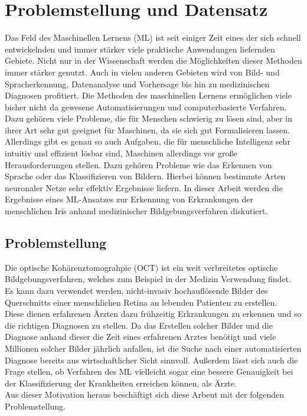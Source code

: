 \chapter{Problemstellung und Datensatz}

Das Feld des Maschinellen Lernens (ML) ist seit einiger Zeit eines der sich
schnell entwickelnden und immer stärker viele praktische Anwendungen liefernden
Gebiete. Nicht nur in der Wissenschaft werden die Möglichkeiten dieser Methoden
immer stärker genutzt. Auch in vielen anderen Gebieten wird von Bild- und
Spracherkennung, Datenanalyse und Vorhersage bis hin zu medizinischen Diagnosen
profitiert. Die Methoden des maschinellen Lernens ermöglichen viele bisher nicht
da gewesene Automatisierungen und computerbasierte Verfahren. \\
Dazu gehören viele Probleme, die für Menschen schwierig zu lösen sind, aber in
ihrer Art sehr gut geeignet für Maschinen, da sie sich gut Formalisieren lassen.
Allerdings gibt es genau so auch Aufgaben, die für menschliche Intelligenz sehr
intuitiv und effizient lösbar sind, Maschinen allerdings vor große
Herausforderungen stellen. Dazu gehören Probleme wie das Erkennen von Sprache
oder das Klassifizieren von Bildern.
Hierbei können bestimmte Arten neuronaler Netze sehr effektiv Ergebnisse
liefern.
In dieser Arbeit werden die Ergebnisse eines ML-Ansatzes zur Erkennung von
Erkrankungen der menschlichen Iris anhand medizinischer Bildgebungsverfahren
diskutiert.

\section{Problemstellung}

Die optische Kohärenztomograhpie (OCT) ist ein weit verbreitetes optische
Bildgebungsverfahren, welches zum Beispiel in der Medizin Verwendung
findet. Es kann dazu verwendet werden, nicht-invasiv hochauflösende
Bilder des Querschnitts einer menschlichen Retina an lebenden Patienten
zu erstellen.\\
Diese dienen erfahrenen Ärzten dazu frühzeitig Erkrankungen zu erkennen
und so die richtigen Diagnosen zu stellen. Da das Erstellen solcher Bilder
und die Diagnose anhand dieser die Zeit eines erfahrenen Arztes benötigt
und viele Millionen solcher Bilder jährlich anfallen, ist die Suche nach
einer automatisierten Diagnose bereits aus wirtschaftlicher Sicht sinnvoll.
Außerdem lässt sich auch die Frage stellen, ob Verfahren des ML vielleicht
sogar eine bessere Genauigkeit bei der Klassifizierung der Krankheiten erreichen
können, als Ärzte.\\
Aus dieser Motivation heraus beschäftigt sich diese Arbeut mit der folgenden
Problemstellung.\\
\newline
\noindent{}\\

